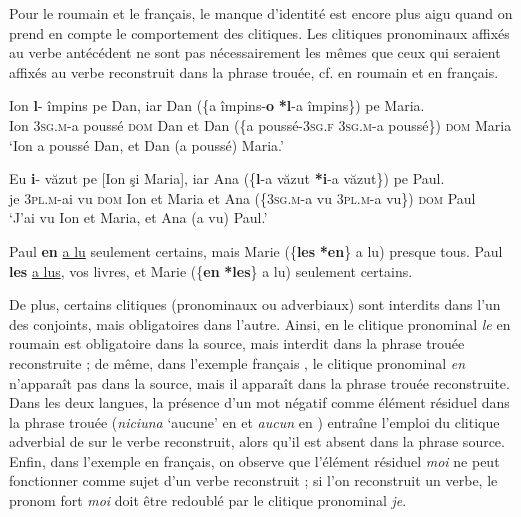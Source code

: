 Pour le roumain et le français, le manque d’identité est encore plus aigu quand on prend en compte le comportement des clitiques. Les clitiques pronominaux affixés au verbe antécédent ne sont pas nécessairement les mêmes que ceux qui seraient affixés au verbe reconstruit dans la phrase trouée, cf.  en roumain et  en français. 

\ea \label{ch2:ex233}
\ea 
\gll Ion \textbf{l}{}- împins pe Dan, iar Dan (\{a  împins-\textbf{o} {\textbar} \textbf{*l}{}-a  împins\}) pe Maria.\\
Ion \textsc{3sg.m}-a  poussé \textsc{dom} Dan et Dan (\{a  poussé-\textsc{3sg.f} {\textbar} \textsc{3sg.m}-a  poussé\}) \textsc{dom} Maria\\
\glt ‘Ion a poussé Dan, et Dan (a poussé) Maria.’

\ex 
\gll Eu \textbf{i}{}- văzut pe [Ion şi Maria], iar Ana (\{\textbf{l}{}-a  văzut {\textbar} \textbf{*i}{}-a văzut\}) pe Paul.\\
je \textsc{3pl.m}-ai vu \textsc{dom} Ion et Maria et Ana (\{\textsc{3sg.m}{}-a vu {\textbar} \textsc{3pl.m}{}-a vu\}) \textsc{dom} Paul\\
\glt ‘J’ai vu Ion et Maria, et Ana (a vu) Paul.’ 
\z
\z


\ea \label{ch2:ex234}
\ea Paul \textbf{en} \uline{a lu} seulement certains, mais Marie (\{\textbf{les} {\textbar} \textbf{*en}\} a lu) presque tous.   
\ex Paul \textbf{les} \uline{a lus}, vos livres, et Marie (\{\textbf{en} {\textbar} \textbf{*les}\} a lu) seulement certains.  
\z
\z

De plus, certains clitiques (pronominaux ou adverbiaux) sont interdits dans l’un des conjoints, mais obligatoires dans l’autre. Ainsi, en  le clitique pronominal \textit{le} en roumain est obligatoire dans la source, mais interdit dans la phrase trouée reconstruite ; de même, dans l’exemple français , le clitique pronominal \textit{en} n’apparaît pas dans la source, mais il apparaît dans la phrase trouée reconstruite. Dans les deux langues, la présence d’un mot négatif comme élément résiduel dans la phrase trouée (\textit{niciuna} ‘aucune’ en  et \textit{aucun} en ) entraîne l’emploi du clitique adverbial de  sur le verbe reconstruit, alors qu’il est absent dans la phrase source. Enfin, dans l’exemple  en français, on observe que l’élément résiduel \textit{moi} ne peut fonctionner comme sujet d’un verbe reconstruit ; si l’on reconstruit un verbe, le pronom fort \textit{moi} doit être redoublé par le clitique pronominal \textit{je}.

